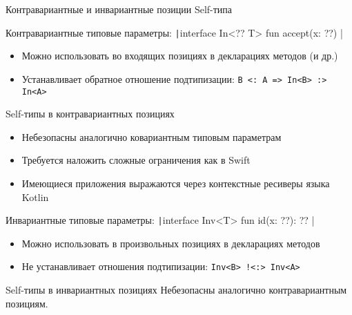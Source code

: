 \documentclass[handout,aspectratio=169,usenames,dvipsnames]{beamer}
\begin{document}
    \begin{frame}{Контравариантные и инвариантные позиции Self-типа}
        \begin{block}{Контравариантные типовые параметры: \texttt|interface In<?? T> { fun accept(x: ??) }|}
            \begin{itemize}
                \item Можно использовать во входящих позициях в декларациях методов (и др.)
                \item Устанавливает обратное отношение подтипизации: \texttt{B <: A => In<B> :> In<A>}
            \end{itemize}
        \end{block}
        \pause
        \begin{block}{Self-типы в контравариантных позициях}
            \begin{itemize}
                \item Небезопасны аналогично ковариантным типовым параметрам
                \item Требуется наложить сложные ограничения как в Swift
                \item Имеющиеся приложения выражаются через контекстные ресиверы языка Kotlin
            \end{itemize}
        \end{block}
        \pause
        \begin{block}{Инвариантные типовые параметры: \texttt|interface Inv<T> { fun id(x: ??): ?? }|}
            \begin{itemize}
                \item Можно использовать в произвольных позициях в декларациях методов
                \item Не устанавливает отношения подтипизации: \texttt{Inv<B> !<:> Inv<A>}
            \end{itemize}
        \end{block}
        \pause
        \begin{block}{Self-типы в инвариантных позициях}
            Небезопасны аналогично контравариантным позициям.
        \end{block}
    \end{frame}
\end{document}
